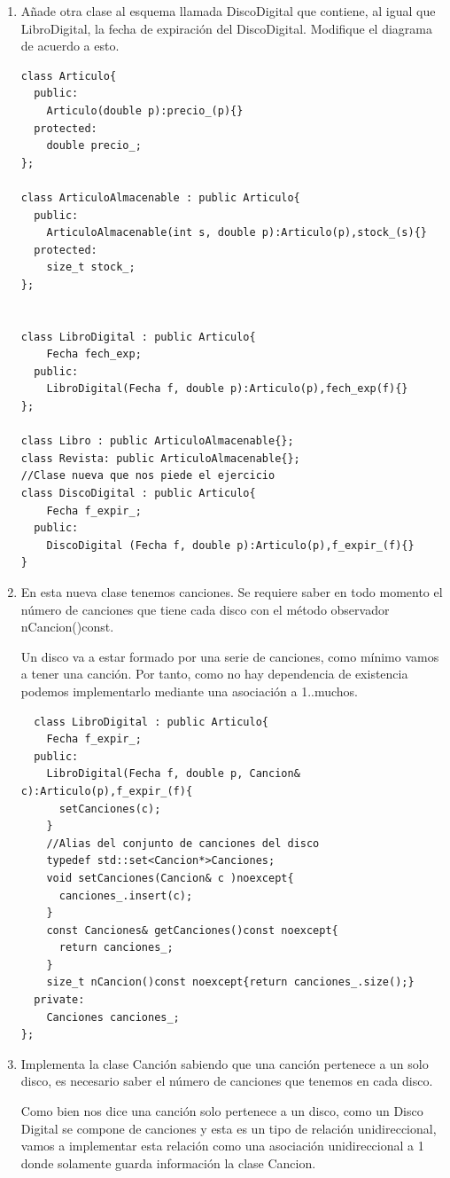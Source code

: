 \begin{enumerate}[label = \alph*)]
  \item Añade otra clase al esquema llamada DiscoDigital que contiene, al igual que LibroDigital, la fecha de expiración del DiscoDigital. Modifique el diagrama de acuerdo a esto.
\begin{verbatim}
class Articulo{
  public:
    Articulo(double p):precio_(p){}
  protected:
    double precio_;
};

class ArticuloAlmacenable : public Articulo{
  public:
    ArticuloAlmacenable(int s, double p):Articulo(p),stock_(s){}
  protected:
    size_t stock_;
};


class LibroDigital : public Articulo{
    Fecha fech_exp;
  public:
    LibroDigital(Fecha f, double p):Articulo(p),fech_exp(f){}
};

class Libro : public ArticuloAlmacenable{};
class Revista: public ArticuloAlmacenable{};
//Clase nueva que nos piede el ejercicio
class DiscoDigital : public Articulo{
    Fecha f_expir_;
  public:
    DiscoDigital (Fecha f, double p):Articulo(p),f_expir_(f){}
}
\end{verbatim}

  \item En esta nueva clase tenemos canciones. Se requiere saber en todo momento el número de canciones que tiene cada disco con el método observador nCancion()const.

  Un disco va a estar formado por una serie de canciones, como mínimo vamos a tener una canción. Por tanto, como no hay dependencia de existencia podemos implementarlo mediante una asociación a 1..muchos.
\begin{verbatim}
  class LibroDigital : public Articulo{
    Fecha f_expir_;
  public:
    LibroDigital(Fecha f, double p, Cancion& c):Articulo(p),f_expir_(f){
      setCanciones(c);
    }
    //Alias del conjunto de canciones del disco
    typedef std::set<Cancion*>Canciones;
    void setCanciones(Cancion& c )noexcept{
      canciones_.insert(c);
    }
    const Canciones& getCanciones()const noexcept{
      return canciones_;
    }
    size_t nCancion()const noexcept{return canciones_.size();}
  private:
    Canciones canciones_;
};
\end{verbatim}
  \item Implementa la clase Canción sabiendo que una canción pertenece a un solo disco, es necesario saber el número de canciones que tenemos en cada disco.

  Como bien nos dice una canción solo pertenece a un disco, como un Disco Digital se compone de canciones y esta es un tipo de relación unidireccional, vamos a implementar esta relación como una asociación unidireccional a 1 donde solamente guarda información la clase Cancion.


\end{enumerate}
